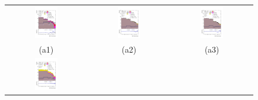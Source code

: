 \begin{figure}[H]
\begin{tabular}{@{}ccc@{}}
\includegraphics[width=0.3\textwidth]{figures/tuH_reg1l2tau1bnj_os.pdf}&
\includegraphics[width=0.3\textwidth]{figures/tuH_reg1l1tau1b1j_ss.pdf}&
\includegraphics[width=0.3\textwidth]{figures/tuH_reg1l1tau1b2j_ss.pdf}\\
(a1)  & (a2) & (a3) \\
\includegraphics[width=0.3\textwidth]{figures/tuH_reg1l1tau1b2j_os.pdf}&

\end{tabular}
\end{figure}
